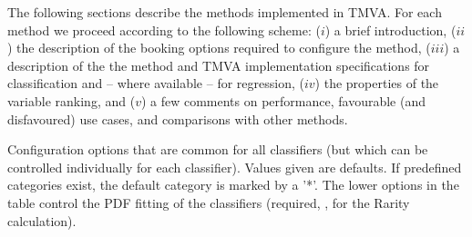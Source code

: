 The following sections describe the methods implemented in TMVA. For each method we 
proceed according to the following scheme: ($i$) a brief introduction, ($ii$) the description 
of the booking options required to configure the method, ($iii$) a description of the 
the method and TMVA implementation specifications for classification and -- where
available -- for regression, ($iv$) the properties of the 
variable ranking, and ($v$) a few comments on performance, favourable (and 
disfavoured) use cases, and comparisons with other methods.
\begin{option}[!t]

\caption[.]{\optionCaptionSize 
   Configuration options that are common for all classifiers (but which can be controlled individually
   for each classifier). Values given are defaults. If predefined categories exist, the default category 
   is marked by a ’*’. The lower options in the table control the PDF fitting of the classifiers (required,
   \eg, for the Rarity calculation).
}
\label{opt:mva::methodbase}
\end{option}

